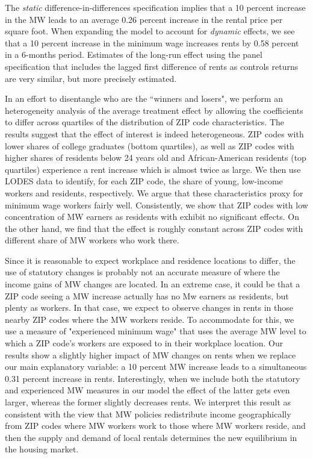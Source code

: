 The \textit{static} difference-in-differences specification implies that a 10 percent increase 
in the MW leads to an average 0.26 percent increase in the rental price per square foot. When 
expanding the model to account for \textit{dynamic} effects, we see that a 10 percent increase 
in the minimum wage increases rents by 0.58 percent in a 6-months period. Estimates of the 
long-run effect using the panel specification that includes the lagged first difference of rents 
as controls returns are very similar, but more precisely estimated.

In an effort to disentangle who are the ``winners and losers", we perform an heterogeneity 
analysis of the average treatment effect by allowing the coefficients to differ across quartiles 
of the distribution of ZIP code characteristics. The results suggest that the effect of interest 
is indeed heterogeneous. ZIP codes with lower shares of college graduates (bottom quartiles), as 
well as ZIP codes with higher shares of residents below 24 years old and African-American 
residents (top quartiles) experience a rent increase which is almost twice as large. We then use 
LODES data to identify, for each ZIP code, the share of young, low-income workers and residents, 
respectively. We argue that these characteristics proxy for minimum wage workers fairly well. 
Consistently, we show that ZIP codes with low concentration of MW earners as residents with 
exhibit no significant effects. On the other hand, we find that the effect is roughly constant 
across ZIP codes with different share of MW workers who work there.

Since it is reasonable to expect workplace and residence locations to differ, the use of 
statutory changes is probably not an accurate measure of where the income gains of MW changes
are located. In an extreme case, it could be that a ZIP code seeing a MW increase actually 
has no Mw earners as residents, but plenty as workers. In that case, we expect to observe 
changes in rents in those nearby ZIP codes where the MW workers reside. To accommodate for 
this, we use a measure of "experienced minimum wage" that uses the average MW level to which 
a ZIP code's workers are exposed to in their workplace location. Our results show a slightly 
higher impact of MW changes on rents when we replace our main explanatory variable: a 10 
percent MW increase leads to a simultaneous 0.31 percent increase in rents. Interestingly, 
when we include both the statutory and experienced MW measures in our model the effect of 
the latter gets even larger, whereas the former slightly decreases rents. We interpret this
result as consistent with the view that MW policies redistribute income geographically from ZIP 
codes where MW workers work to those where MW workers reside, and then the supply and demand 
of local rentals determines the new equilibrium in the housing market.

